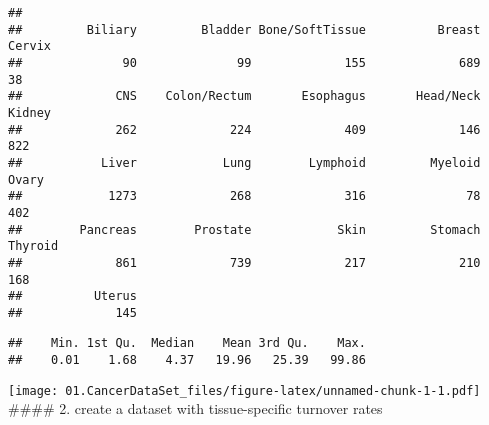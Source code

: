 \documentclass[
]{article}
\newenvironment{Shaded}{\begin{snugshade}}{\end{snugshade}}
\newcommand{\CommentTok}[1]{\textcolor[rgb]{0.56,0.35,0.01}{\textit{#1}}}
\newcommand{\DataTypeTok}[1]{\textcolor[rgb]{0.13,0.29,0.53}{#1}}
\newcommand{\DecValTok}[1]{\textcolor[rgb]{0.00,0.00,0.81}{#1}}
\newcommand{\KeywordTok}[1]{\textcolor[rgb]{0.13,0.29,0.53}{\textbf{#1}}}
\newcommand{\NormalTok}[1]{#1}
\newcommand{\OperatorTok}[1]{\textcolor[rgb]{0.81,0.36,0.00}{\textbf{#1}}}
\newcommand{\StringTok}[1]{\textcolor[rgb]{0.31,0.60,0.02}{#1}}
\begin{document}
\begin{Shaded}
\end{Shaded}

\begin{verbatim}
## 
##         Biliary         Bladder Bone/SoftTissue          Breast          Cervix 
##              90              99             155             689              38 
##             CNS    Colon/Rectum       Esophagus       Head/Neck          Kidney 
##             262             224             409             146             822 
##           Liver            Lung        Lymphoid         Myeloid           Ovary 
##            1273             268             316              78             402 
##        Pancreas        Prostate            Skin         Stomach         Thyroid 
##             861             739             217             210             168 
##          Uterus 
##             145
\end{verbatim}

\begin{Shaded}
\end{Shaded}

\begin{verbatim}
##    Min. 1st Qu.  Median    Mean 3rd Qu.    Max. 
##    0.01    1.68    4.37   19.96   25.39   99.86
\end{verbatim}

\begin{Shaded}
\end{Shaded}

\texttt{[image: 01.CancerDataSet\_files/figure-latex/unnamed-chunk-1-1.pdf]}
\#\#\#\# 2. create a dataset with tissue-specific turnover rates
\end{document}
